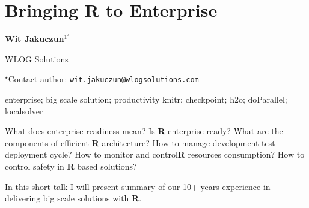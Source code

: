 \documentclass[\main/boa.tex]{subfiles}
\begin{document}
\section{Bringing R to Enterprise}

\begin{center}
  {\bf {} Wit Jakuczun$^{1^\star}$}
\end{center}

\vskip 0.3cm

\begin{affiliations}
\begin{enumerate}
\begin{minipage}{0.915\textwidth}
\centering
\item WLOG Solutions \\[-2pt]
\end{minipage}
\end{enumerate}
$^\star$Contact author: \href{mailto:wit.jakuczun@wlogsolutions.com}{\nolinkurl{wit.jakuczun@wlogsolutions.com}}\\
\end{affiliations}

\vskip 0.5cm

\begin{minipage}{0.915\textwidth}
\keywords enterprise; big scale solution; productivity
\packages {} knitr;  checkpoint;  h2o;  doParallel;  localsolver
\end{minipage}

\vskip 0.8cm

What does enterprise readiness mean? Is \textbf{R} enterprise ready? 
What are the components of efficient \textbf{R} architecture?
How to manage development-test-deployment cycle? How to monitor and 
control\textbf{R} resources consumption? How to control safety in 
\textbf{R} based solutions?

In this short talk I will present summary of our 10+ years experience in
delivering big scale solutions with \textbf{R}. 
\end{document}
